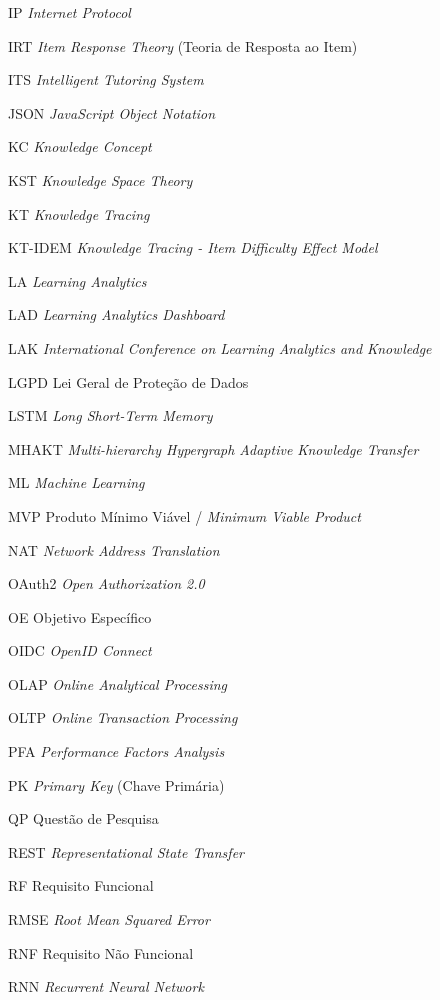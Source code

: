 \begin{siglas}
  \item[IP] \textit{Internet Protocol}
  \item[IRT] \textit{Item Response Theory} (Teoria de Resposta ao Item)
  \item[ITS] \textit{Intelligent Tutoring System}
  \item[JSON] \textit{JavaScript Object Notation}
  \item[KC] \textit{Knowledge Concept}
  \item[KST] \textit{Knowledge Space Theory}
  \item[KT] \textit{Knowledge Tracing}
  \item[KT-IDEM] \textit{Knowledge Tracing - Item Difficulty Effect Model}
  \item[LA] \textit{Learning Analytics}
  \item[LAD] \textit{Learning Analytics Dashboard}
  \item[LAK] \textit{International Conference on Learning Analytics and Knowledge}
  \item[LGPD] Lei Geral de Proteção de Dados
  \item[LSTM] \textit{Long Short-Term Memory}
  \item[MHAKT] \textit{Multi-hierarchy Hypergraph Adaptive Knowledge Transfer}
  \item[ML] \textit{Machine Learning}
  \item[MVP] Produto Mínimo Viável / \textit{Minimum Viable Product}
  \item[NAT] \textit{Network Address Translation}
  \item[OAuth2] \textit{Open Authorization 2.0}
  \item[OE] Objetivo Específico
  \item[OIDC] \textit{OpenID Connect}
  \item[OLAP] \textit{Online Analytical Processing}
  \item[OLTP] \textit{Online Transaction Processing}
  \item[PFA] \textit{Performance Factors Analysis}
  \item[PK] \textit{Primary Key} (Chave Primária)
  \item[QP] Questão de Pesquisa
  \item[REST] \textit{Representational State Transfer}
  \item[RF] Requisito Funcional
  \item[RMSE] \textit{Root Mean Squared Error}
  \item[RNF] Requisito Não Funcional
  \item[RNN] \textit{Recurrent Neural Network}

\end{siglas}
